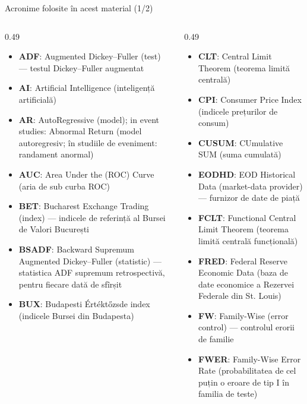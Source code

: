 \begin{frame}{Acronime folosite în acest material (1/2)}
\begin{columns}[T]
\begin{column}{0.49\textwidth}
\begin{itemize}\setlength{\itemsep}{0pt}
    \item \textbf{ADF}: Augmented Dickey–Fuller (test) — testul Dickey–Fuller augmentat
    \item \textbf{AI}: Artificial Intelligence (inteligență artificială)
    \item \textbf{AR}: AutoRegressive (model); in event studies: Abnormal Return (model autoregresiv; în studiile de eveniment: randament anormal)
    \item \textbf{AUC}: Area Under the (ROC) Curve (aria de sub curba ROC)
    \item \textbf{BET}: Bucharest Exchange Trading (index) — indicele de referință al Bursei de Valori București
    \item \textbf{BSADF}: Backward Supremum Augmented Dickey–Fuller (statistic) — statistica ADF supremum retrospectivă, pentru fiecare dată de sfîrșit
    \item \textbf{BUX}: Budapesti Értéktőzsde index (indicele Bursei din Budapesta)
\end{itemize}
\end{column}
\begin{column}{0.49\textwidth}
\begin{itemize}\setlength{\itemsep}{0pt}
    \item \textbf{CLT}: Central Limit Theorem (teorema limită centrală)
    \item \textbf{CPI}: Consumer Price Index (indicele prețurilor de consum)
    \item \textbf{CUSUM}: CUmulative SUM (suma cumulată)
    \item \textbf{EODHD}: EOD Historical Data (market-data provider) — furnizor de date de piață
    \item \textbf{FCLT}: Functional Central Limit Theorem (teorema limită centrală funcțională)
    \item \textbf{FRED}: Federal Reserve Economic Data (baza de date economice a Rezervei Federale din St. Louis)
    \item \textbf{FW}: Family-Wise (error control) — controlul erorii de familie
    \item \textbf{FWER}: Family-Wise Error Rate (probabilitatea de cel puțin o eroare de tip I în familia de teste)
\end{itemize}
\end{column}
\end{columns}
\end{frame}
